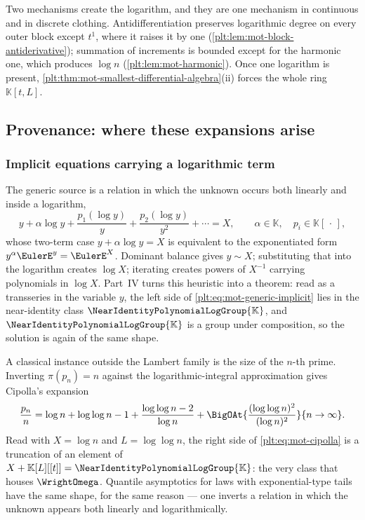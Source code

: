 \documentclass[11pt,oneside]{article}
\theoremstyle{plain}
\theoremstyle{definition}
\theoremstyle{remark}
\newcommand{\K}{\mathbb{K}}
\newcommand{\Gnear}{\NearIdentityPolynomialLogGroup{\K}} %
\begin{document}
\begin{summarybox}
Two mechanisms create the logarithm, and they are one mechanism in continuous
and in discrete clothing.  Antidifferentiation preserves logarithmic degree on
every outer block except \(t^{1}\), where it raises it by one
(\cref{plt:lem:mot-block-antiderivative}); summation of increments is bounded
except for the harmonic one, which produces \(\log n\)
(\cref{plt:lem:mot-harmonic}).  Once one logarithm is present,
\cref{plt:thm:mot-smallest-differential-algebra}(ii) forces the whole ring
\(\K[t,L]\).
\end{summarybox}

\subsection{Provenance: where these expansions arise}
\label{plt:sec:mot-provenance}

\subsubsection{Implicit equations carrying a logarithmic term}

The generic source is a relation in which the unknown occurs both linearly and
inside a logarithm,
\begin{equation}\label{plt:eq:mot-generic-implicit}
  y+\alpha\log y+\frac{p_{1}(\log y)}{y}+\frac{p_{2}(\log y)}{y^{2}}+\cdots=X,
  \qquad \alpha\in\K,\quad p_{i}\in\K[\,\cdot\,],
\end{equation}
whose two-term case \(y+\alpha\log y=X\) is equivalent to the exponentiated
form \(y^{\alpha}\EulerE^{y}=\EulerE^{X}\).  Dominant
balance gives \(y\sim X\); substituting that into the logarithm creates
\(\log X\); iterating creates powers of \(X^{-1}\) carrying polynomials in
\(\log X\).  Part~IV turns this heuristic into a theorem: read as a transseries
in the variable \(y\), the left side of \eqref{plt:eq:mot-generic-implicit}
lies in the near-identity class \(\Gnear\), and \(\Gnear\) is a group under
composition, so the solution is again of the same shape.

A classical instance outside the Lambert family is the size of the \(n\)-th
prime.  Inverting \(\pi(p_{n})=n\) against the logarithmic-integral
approximation gives Cipolla's expansion
\begin{equation}\label{plt:eq:mot-cipolla}
  \frac{p_{n}}{n}=\log n+\log\log n-1
   +\frac{\log\log n-2}{\log n}
   +\BigOAt{\frac{(\log\log n)^{2}}{(\log n)^{2}}}{n\to\infty}.
\end{equation}
Read with \(X=\log n\) and \(L=\log\log n\), the right side of
\eqref{plt:eq:mot-cipolla} is a truncation of an element of
\(X+\K[L][[t]]=\Gnear\): the very class that houses \(\WrightOmega\).  Quantile
asymptotics for laws with exponential-type tails have the same shape, for the
same reason --- one inverts a relation in which the unknown appears both
linearly and logarithmically.
\end{document}
